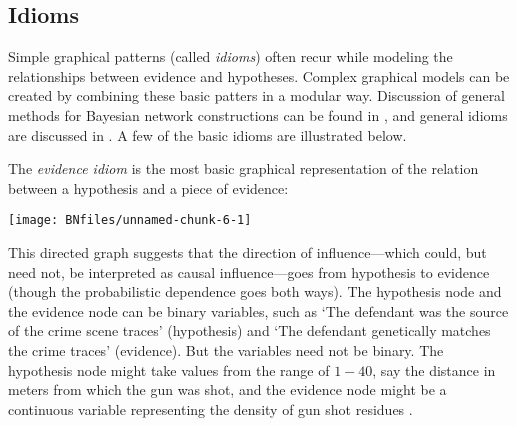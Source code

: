 \documentclass{article}
\begin{document}
\subsection{Idioms} 

Simple graphical patterns (called \emph{idioms}) often recur while modeling the relationships between evidence and hypotheses. Complex graphical models can be created by combining these basic patters 
in a modular way. Discussion of general methods for Bayesian network constructions can be found in \citep{neil2000BuildingLargescaleBayesian},
\citep{hepler2007ObjectorientedGraphicalRepresentations} and general idioms are discussed in \citep{fenton2013GeneralStructureLegal}. A few of the basic idioms
are illustrated below.

The \emph{evidence idiom} is the most basic graphical representation of the relation between a hypothesis and a piece of evidence:

\begin{center}\texttt{[image: BNfiles/unnamed-chunk-6-1]} \end{center}

\noindent 
This directed graph suggests that the direction of influence---which could, but need not, be interpreted as causal influence---goes from hypothesis to evidence (though the probabilistic dependence goes both ways). 
The hypothesis node and the evidence node can be binary variables, such as
`The defendant was the
source of the crime scene traces' (hypothesis) and `The defendant genetically matches the crime traces' (evidence). But the variables need not be binary. The hypothesis node might take values from the range of \(1-40\), say the distance in meters from which the gun was shot, and the evidence node might be a continuous variable representing the density of gun shot residues  %
\citep{taroni2006bayesian}.
\end{document}
